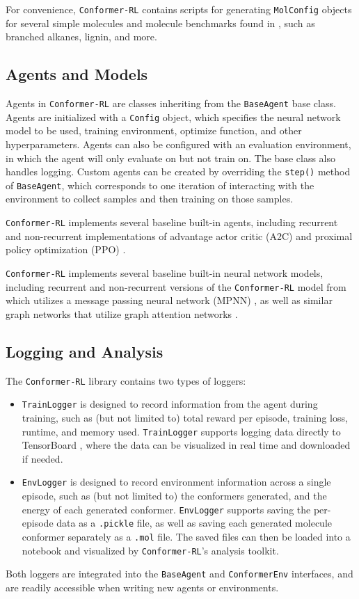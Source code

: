 \documentclass[twoside,11pt]{article}
\newcommand{\code}[1]{\texttt{#1}}
\newcommand{\titleofpaper}{Conformer-RL}
\begin{document}
  For convenience, \code{\titleofpaper} contains scripts for generating \code{MolConfig} objects for several simple molecules and molecule benchmarks found in \citet{gogineni2020torsionnet}, such as branched alkanes, lignin, and more.

\subsection{Agents and Models}
Agents in \code{\titleofpaper} are classes inheriting from the \code{BaseAgent} base class. Agents are initialized with a \code{Config} object, which specifies the neural network model to be used, training environment, optimize function, and other hyperparameters. Agents can also be configured with an evaluation environment, in which the agent will only evaluate on but not train on. The base class also handles logging. Custom agents can be created by overriding the \code{step()} method of \code{BaseAgent}, which corresponds to one iteration of interacting with the environment to collect samples and then training on those samples.

\code{\titleofpaper} implements several baseline built-in agents, including recurrent and non-recurrent implementations of advantage actor critic (A2C) \citep{wu2017a2c} and proximal policy optimization (PPO) \citep{schulman2017ppo}.

\code{\titleofpaper} implements several baseline built-in neural network models, including recurrent and non-recurrent versions of the \code{\titleofpaper} model from \citep{gogineni2020torsionnet} which utilizes a message passing neural network (MPNN) \citep{gilmer2017mpnn}, as well as similar graph networks that utilize graph attention networks \citep{gatnn}.

\subsection{Logging and Analysis}
The \code{\titleofpaper} library contains two types of loggers:
\begin{itemize}
  \item \code{TrainLogger} is designed to record information from the agent during training, such as (but not limited to) total reward per episode, training loss, runtime, and memory used. \code{TrainLogger} supports logging data directly to TensorBoard \citep{tensorflow2015-whitepaper}, where the data can be visualized in real time and downloaded if needed.
  \item \code{EnvLogger} is designed to record environment information across a single episode, such as (but not limited to) the conformers generated, and the energy of each generated conformer. \code{EnvLogger} supports saving the per-episode data as a \code{.pickle} file, as well as saving each generated molecule conformer separately as a \code{.mol} file. The saved files can then be loaded into a notebook and visualized by \code{\titleofpaper}'s analysis toolkit.
\end{itemize}
Both loggers are integrated into the \code{BaseAgent} and \code{ConformerEnv} interfaces, and are readily accessible when writing new agents or environments.
\end{document}
